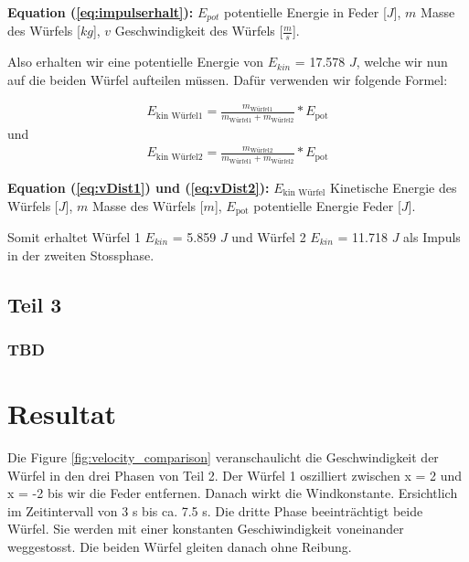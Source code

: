 \documentclass{article}
\begin{document}
\scriptsize
\textbf{Equation (\ref{eq:impulserhalt}):} $E_{pot}$ potentielle Energie in Feder [$J$], $m$ Masse des Würfels [$kg$], $v$ Geschwindigkeit des Würfels [$\frac{m}{s}$].
\newline

\normalsize
\noindent
Also erhalten wir eine potentielle Energie von $E_{kin}$ = 17.578 $J$, welche wir nun auf die beiden Würfel aufteilen müssen. Dafür verwenden wir folgende Formel:

\begin{equation}\label{eq:vDist1}
\begin{aligned}
E_{\text{kin Würfel1}} = \frac{m_{\text{Würfel1}}}{m_{\text{Würfel1}} + m_{\text{Würfel2}}} * E_{\text{pot}}
\end{aligned}
\end{equation}
und
\begin{equation}\label{eq:vDist2}
\begin{aligned}
E_{\text{kin Würfel2}} = \frac{m_{\text{Würfel2}}}{m_{\text{Würfel1}} + m_{\text{Würfel2}}} * E_{\text{pot}}
\end{aligned}
\end{equation}

\scriptsize
\textbf{Equation (\ref{eq:vDist1}) und (\ref{eq:vDist2}):} $E_{\text{kin Würfel}}$ Kinetische Energie des Würfels [$J$], $m$ Masse des Würfels [$m$], $E_{\text{pot}}$ potentielle Energie Feder [$J$].
\newline

\normalsize
\noindent
Somit erhaltet Würfel 1 $E_{kin}$ = 5.859 $J$ und Würfel 2 $E_{kin}$ = 11.718 $J$ als Impuls in der zweiten Stossphase.

\newpage
\subsection{Teil 3}
\subsubsection{TBD}

\newpage
\section{Resultat}
Die Figure \ref{fig:velocity_comparison} veranschaulicht die Geschwindigkeit der Würfel in den drei Phasen von Teil 2. Der Würfel 1 oszilliert zwischen x = 2 und x = -2 bis wir die Feder entfernen. Danach wirkt die Windkonstante. Ersichtlich im Zeitintervall von 3 s bis ca. 7.5 s. Die dritte Phase beeinträchtigt beide Würfel. Sie werden mit einer konstanten Geschiwindigkeit voneinander weggestosst. Die beiden Würfel gleiten danach ohne Reibung.
\end{document}
